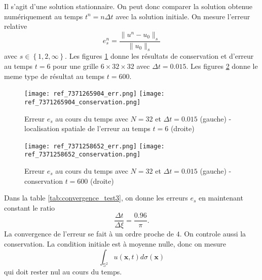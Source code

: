 \documentclass[10pt,a4paper]{article}
\def\gint{\displaystyle\int}
\begin{document}
Il s'agit d'une solution stationnaire. On peut donc comparer la solution obtenue numériquement au temps $t^n = n \Delta t$ avec la solution initiale. On mesure l'erreur relative
\begin{equation}
e_s^n = \dfrac{\| u^n - u_0 \|_s}{\| u_0 \|_s}
\end{equation}
avec $s \in \left\lbrace 1, 2, \infty \right\rbrace$. Les figures \ref{fig:test3a} donne les résultats de conservation et d'erreur au temps $t=6$ pour une grille $6 \times 32 \times 32$ avec $\Delta t = 0.015$. Les figures \ref{fig:test3b} donne le meme type de résultat au temps $t=600$.

\begin{figure}
\begin{center}
\texttt{[image: ref\_7371265904\_err.png]}
\texttt{[image: ref\_7371265904\_conservation.png]}
\caption{Erreur $e_s$ au cours du temps avec $N=32$ et $\Delta t =0.015$ (gauche) - localisation spatiale de l'erreur au temps $t=6$ (droite)}
\end{center}
\label{fig:test3a}
\end{figure}

\begin{figure}
\begin{center}
\texttt{[image: ref\_7371258652\_err.png]}
\texttt{[image: ref\_7371258652\_conservation.png]}
\caption{Erreur $e_s$ au cours du temps avec $N=32$ et $\Delta t =0.015$ (gauche) - conservation $t=600$ (droite)}
\end{center}
\label{fig:test3b}
\end{figure}

Dans la table \ref{tab:convergence_test3}, on donne les erreurs $e_s$ en maintenant constant le ratio
\begin{equation}
\dfrac{\Delta t}{\Delta \xi} = \dfrac{0.96}{\pi}.
\end{equation}
La convergence de l'erreur se fait à un ordre proche de $4$. On controle aussi la conservation. La condition initiale est à moyenne nulle, donc on mesure
\begin{equation}
\gint_{\mathbb{S}^2} u(\mathbf{x}, t) d\sigma(\mathbf{x})
\end{equation}
qui doit rester nul au cours du temps.
\end{document}
